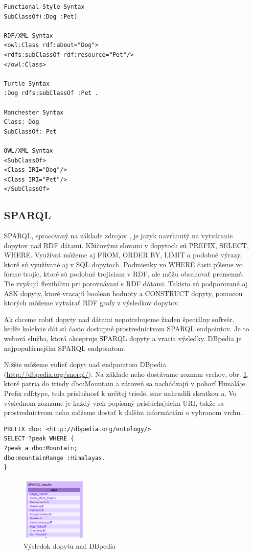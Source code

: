\begin{verbatim}
Functional-Style Syntax
SubClassOf(:Dog :Pet)

RDF/XML Syntax
<owl:Class rdf:about="Dog">
<rdfs:subClassOf rdf:resource="Pet"/>
</owl:Class>

Turtle Syntax
:Dog rdfs:subClassOf :Pet .

Manchester Syntax
Class: Dog
SubClassOf: Pet

OWL/XML Syntax
<SubClassOf>
<Class IRI="Dog"/>
<Class IRI="Pet"/>
</SubClassOf>
\end{verbatim}

\subsection{SPARQL} \label{secSparql}
SPARQL, spracovaný na základe zdrojov \cite{sparql, sparql2}, je jazyk navrhnutý na vytváranie
dopytov nad RDF dátami. Kľúčovými slovami v dopytoch sú PREFIX, SELECT,
WHERE. Využívať môžeme aj FROM, ORDER BY, LIMIT a podobné výrazy,
ktoré sú využívané aj v SQL dopytoch. Podmienky vo WHERE časti píšeme vo forme
trojíc, ktoré sú podobné trojiciam v RDF, ale môžu obsahovať premenné. Tie zvyšujú flexibilitu pri porovnávaní s RDF dátami. Takisto sú podporované aj
ASK dopyty, ktoré vracajú boolean hodnoty a CONSTRUCT dopyty,
pomocou ktorých môžeme vytvárať RDF grafy z výsledkov dopytov.

Ak chceme robiť dopyty nad dátami nepotrebujeme žiaden špeciálny softvér, keďže
kolekcie dát sú často dostupné prostredníctvom SPARQL endpointov. Je to webová
služba, ktorá akceptuje SPARQL dopyty a vracia výsledky. DBpedia je najpopulárnejším SPARQL endpointom.

Nižšie môžeme vidieť dopyt nad endpointom DBpedia
 (\href{http://dbpedia.org/snorql/}{http://dbpedia.org/snorql/}).
Na základe neho dostávame zoznam vrchov, obr. \ref{dopyt}, ktoré patria do triedy dbo:Mountain a zároveň sa nachádzajú v pohorí Himaláje.
Prefix rdf:type, teda príslušnosť k určitej triede, sme nahradili skratkou a. Vo výslednom zozname je každý vrch popísaný prislúchajúcim URI, takže sa prostredníctvom neho môžeme dostať
k ďalším informáciám o vybranom vrchu.

\begin{verbatim}
PREFIX dbo: <http://dbpedia.org/ontology/>
SELECT ?peak WHERE {
?peak a dbo:Mountain;
dbo:mountainRange :Himalayas.
}
\end{verbatim}

\begin{figure}[h]
\centering
\includegraphics[width=0.3\textwidth]{images/dopytDBpedia}
\caption{Výsledok dopytu nad DBpedia}
\label{dopyt}
\end{figure}

